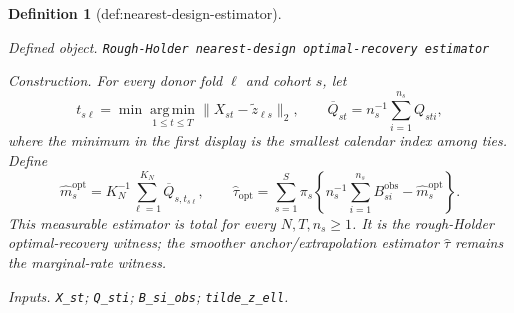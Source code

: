 \documentclass{article}
\newtheorem{definition}{Definition}
\begin{document}
\begin{definition}[def:nearest-design-estimator]\label{def:nearest-design-estimator}
\par\smallskip\noindent\emph{Defined object.} \texttt{Rough-\allowbreak{}Holder nearest-\allowbreak{}design optimal-\allowbreak{}recovery estimator}
\par\smallskip\noindent\emph{Construction.} For every donor fold \(\ell\) and cohort \(s\), let
\[
 t_{s\ell}
 =\min\operatorname*{arg\,min}_{1\le t\le T}
       \|X_{st}-\widetilde z_{\ell s}\|_2,
 \qquad
 \overline Q_{st}=n_s^{-1}\sum_{i=1}^{n_s}Q_{sti},
\]
where the minimum in the first display is the smallest calendar index among
ties.  Define
\[
 \widehat m_s^{\mathrm{opt}}
 =K_N^{-1}\sum_{\ell=1}^{K_N}\overline Q_{s,t_{s\ell}},
 \qquad
 \widehat\tau_{\mathrm{opt}}
 =\sum_{s=1}^{S}\pi_s\left\{
 n_s^{-1}\sum_{i=1}^{n_s}B_{si}^{\mathrm{obs}}
 -\widehat m_s^{\mathrm{opt}}\right\}.
\]
This measurable estimator is total for every \(N,T,n_s\ge1\).  It is the
rough-Holder optimal-recovery witness; the smoother anchor/extrapolation
estimator \(\widehat\tau\) remains the marginal-rate witness.
\par\smallskip\noindent\emph{Inputs.} \texttt{X\_\allowbreak{}st}; \texttt{Q\_\allowbreak{}sti}; \texttt{B\_\allowbreak{}si\_\allowbreak{}obs}; \texttt{tilde\_\allowbreak{}z\_\allowbreak{}ell}.
\end{definition}
\end{document}

